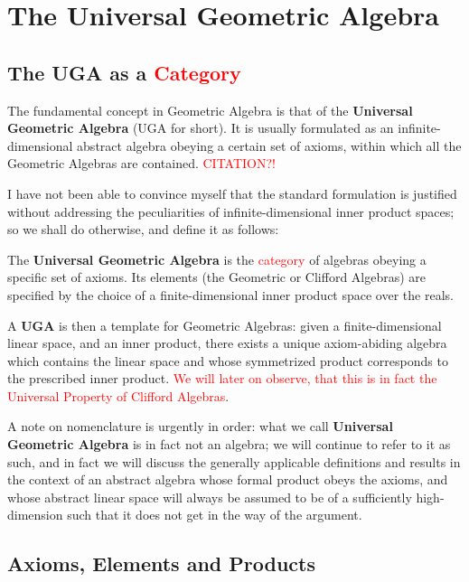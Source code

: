 \section{The Universal Geometric Algebra}
\subsection{The UGA as a \textcolor{red}{Category}}

The fundamental concept in Geometric Algebra is that of the \textbf{Universal Geometric Algebra} (UGA for short). It is usually formulated as an infinite-dimensional abstract algebra obeying a certain set of axioms, within which all the Geometric Algebras are contained. \textcolor{red}{CITATION?!}

I have not been able to convince myself that the standard formulation is justified without addressing the peculiarities of infinite-dimensional inner product spaces; so we shall do otherwise, and define it as follows:
\begin{definition}
	The \textbf{Universal Geometric Algebra} is the \textcolor{red}{category} of algebras obeying a specific set of axioms. Its elements (the Geometric or Clifford Algebras) are specified by the choice of a finite-dimensional inner product space over the reals.
\end{definition}

A \textbf{UGA} is then a template for Geometric Algebras: given a finite-dimensional linear space, and an inner product, there exists a unique axiom-abiding algebra which contains the linear space and whose symmetrized product corresponds to the prescribed inner product. \textcolor{red}{We will later on observe, that this is in fact the Universal Property of Clifford Algebras}.

A note on nomenclature is urgently in order: what we call \textbf{Universal Geometric Algebra} is in fact not an algebra; we will continue to refer to it as such, and in fact we will discuss the generally applicable definitions and results in the context of an abstract algebra whose formal product obeys the axioms, and whose abstract linear space will always be assumed to be of a sufficiently high-dimension such that it does not get in the way of the argument.

\subsection{Axioms, Elements and Products}

